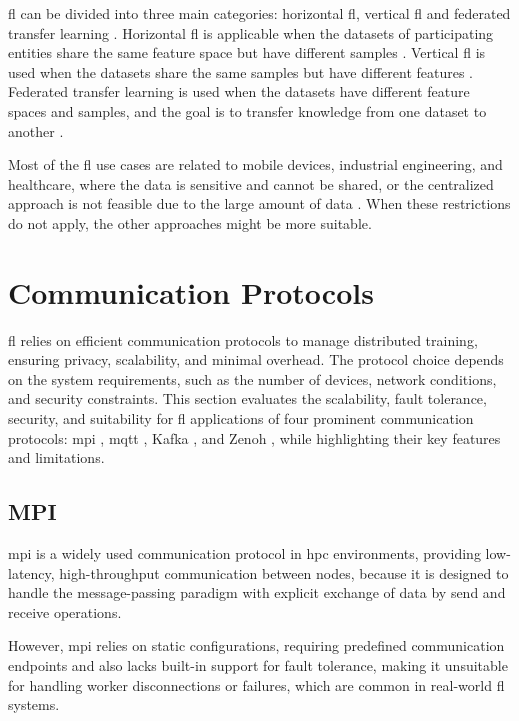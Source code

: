 \ac{fl} can be divided into three main categories: horizontal \ac{fl}, vertical \ac{fl} and federated transfer learning \cite{yang2019federated}. Horizontal \ac{fl} is applicable when the datasets of participating entities share the same feature space but have different samples \cite{yang2020horizontal}. Vertical \ac{fl} is used when the datasets share the same samples but have different features \cite{liu2024vertical}. Federated transfer learning is used when the datasets have different feature spaces and samples, and the goal is to transfer knowledge from one dataset to another \cite{saha2021federated}.

Most of the \ac{fl} use cases are related to mobile devices, industrial engineering, and healthcare, where the data is sensitive and cannot be shared, or the centralized approach is not feasible due to the large amount of data \cite{li2020review}. When these restrictions do not apply, the other approaches might be more suitable.

\section{Communication Protocols}
\label{sec:communication-protocols}

\ac{fl} relies on efficient communication protocols to manage distributed training, ensuring privacy, scalability, and minimal overhead. The protocol choice depends on the system requirements, such as the number of devices, network conditions, and security constraints. This section evaluates the scalability, fault tolerance, security, and suitability for \ac{fl} applications of four prominent communication protocols: \ac{mpi} \cite{gabriel2004open}, \ac{mqtt} \cite{light2017mosquitto}, Kafka \cite{kreps2011kafka}, and Zenoh \cite{corsaro2023zenoh}, while highlighting their key features and limitations.

\subsection{MPI}
\label{sec:mpi}

\ac{mpi} is a widely used communication protocol in \ac{hpc} environments, providing low-latency, high-throughput communication between nodes, because it is designed to handle the message-passing paradigm with explicit exchange of data by send and receive operations. 

However, \ac{mpi} relies on static configurations, requiring predefined communication endpoints and also lacks built-in support for fault tolerance, making it unsuitable for handling worker disconnections or failures, which are common in real-world \ac{fl} systems. 

